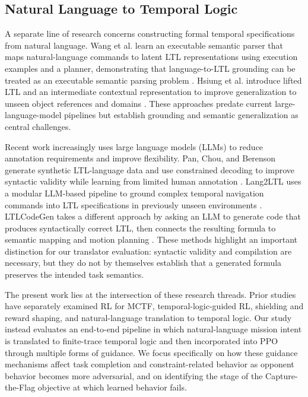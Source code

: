 \documentclass[letterpaper]{article}
\begin{document}
\subsection{Natural Language to Temporal Logic}

A separate line of research concerns constructing formal temporal specifications from natural language. Wang et al. learn an executable semantic parser that maps natural-language commands to latent LTL representations using execution examples and a planner, demonstrating that language-to-LTL grounding can be treated as an executable semantic parsing problem \cite{wang2021semantic}. Hsiung et al. introduce lifted LTL and an intermediate contextual representation to improve generalization to unseen object references and domains \cite{hsiung2022lifted}. These approaches predate current large-language-model pipelines but establish grounding and semantic generalization as central challenges.

Recent work increasingly uses large language models (LLMs) to reduce annotation requirements and improve flexibility. Pan, Chou, and Berenson generate synthetic LTL-language data and use constrained decoding to improve syntactic validity while learning from limited human annotation \cite{pan2023dataefficient}. Lang2LTL uses a modular LLM-based pipeline to ground complex temporal navigation commands into LTL specifications in previously unseen environments \cite{liu2023lang2ltl}. LTLCodeGen takes a different approach by asking an LLM to generate code that produces syntactically correct LTL, then connects the resulting formula to semantic mapping and motion planning \cite{rabiei2025ltlcodegen}. These methods highlight an important distinction for our translator evaluation: syntactic validity and compilation are necessary, but they do not by themselves establish that a generated formula preserves the intended task semantics.

The present work lies at the intersection of these research threads. Prior studies have separately examined RL for MCTF, temporal-logic-guided RL, shielding and reward shaping, and natural-language translation to temporal logic. Our study instead evaluates an end-to-end pipeline in which natural-language mission intent is translated to finite-trace temporal logic and then incorporated into PPO through multiple forms of guidance. We focus specifically on how these guidance mechanisms affect task completion and constraint-related behavior as opponent behavior becomes more adversarial, and on identifying the stage of the Capture-the-Flag objective at which learned behavior fails.
\end{document}
